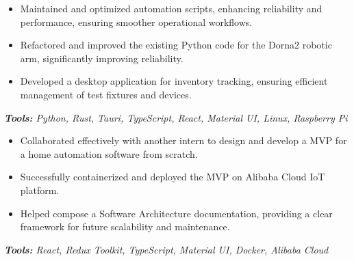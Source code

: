 \documentclass[10pt,letter]{altacv}
\begin{document}

\begin{fullwidth}
\makecvheader
\end{fullwidth}


\medskip


\begin{itemize}
  \item Maintained and optimized automation scripts, enhancing reliability and performance, ensuring smoother operational workflows.
  \item Refactored and improved the existing Python code for the Dorna2 robotic arm, significantly improving reliability.
  \item Developed a desktop application for inventory tracking, ensuring efficient management of test fixtures and devices.
\end{itemize}
\textit{\textbf{Tools:} Python, Rust, Tauri, TypeScript, React, Material UI, Linux, Raspberry Pi}

\divider

\begin{itemize}
  \item Collaborated effectively with another intern to design and develop a MVP for a home automation software from scratch.
  \item Successfully containerized and deployed the MVP on Alibaba Cloud IoT platform.
  \item Helped compose a Software Architecture documentation, providing a clear framework for future scalability and maintenance.
\end{itemize}
\textit{\textbf{Tools:} React, Redux Toolkit, TypeScript, Material UI, Docker, Alibaba Cloud}
\end{document}
